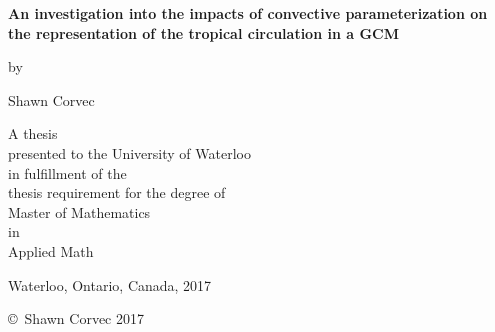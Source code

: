 \pagestyle{empty}

\begin{titlepage}
        \begin{center}
        \vspace*{1.0cm}

        \Huge
        {\bf{An investigation into the impacts of convective parameterization on the representation of the tropical circulation in a GCM} }

        \vspace*{1.0cm}

        \normalsize
        by \\

        \vspace*{1.0cm}

        \Large
        Shawn Corvec\\

        \vspace*{3.0cm}

        \normalsize
        A thesis \\
        presented to the University of Waterloo \\ 
        in fulfillment of the \\
        thesis requirement for the degree of \\
        Master of Mathematics \\
        in \\
        Applied Math \\

        \vspace*{2.0cm}

        Waterloo, Ontario, Canada, 2017 \\

        \vspace*{1.0cm}

        \copyright\ Shawn Corvec 2017 \\
        \end{center}
\end{titlepage}

\pagestyle{plain}
\setcounter{page}{2}

